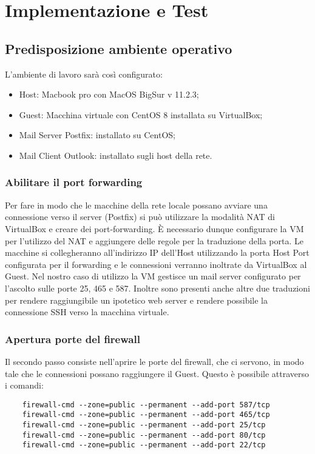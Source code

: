 \chapter{Implementazione e Test}

\section{Predisposizione ambiente operativo}

L'ambiente di lavoro sarà così configurato:

\begin{itemize}
    \item Host: Macbook pro con MacOS BigSur v 11.2.3;
    \item Guest: Macchina virtuale con CentOS 8 installata su VirtualBox;
    \item Mail Server Postfix: installato su CentOS;
    \item Mail Client Outlook: installato sugli host della rete.
\end{itemize}

\subsection{Abilitare il port forwarding}
Per fare in modo che le macchine della rete locale possano avviare una connessione
verso il server (Postfix) si può utilizzare la modalità NAT di VirtualBox e creare dei 
port-forwarding. È necessario dunque configurare la VM per l'utilizzo del NAT e aggiungere delle regole
per la traduzione della porta.
Le macchine si collegheranno all'indirizzo IP dell'Host utilizzando la porta Host Port configurata
per il forwarding e le connessioni verranno inoltrate da VirtualBox al Guest.
Nel nostro caso di utilizzo la VM gestisce un mail server configurato per l'ascolto sulle porte 25, 465 e
587. Inoltre sono presenti anche altre due traduzioni per rendere raggiungibile un ipotetico web server e rendere possibile
la connessione SSH verso la macchina virtuale.

\subsection{Apertura porte del firewall}

Il secondo passo consiste nell’aprire le porte del firewall, che ci servono, in modo tale che le connessioni 
possano raggiungere il Guest. Questo è possibile attraverso i comandi:

\begin{verbatim}
    firewall-cmd --zone=public --permanent --add-port 587/tcp
    firewall-cmd --zone=public --permanent --add-port 465/tcp
    firewall-cmd --zone=public --permanent --add-port 25/tcp
    firewall-cmd --zone=public --permanent --add-port 80/tcp
    firewall-cmd --zone=public --permanent --add-port 22/tcp
\end{verbatim}

